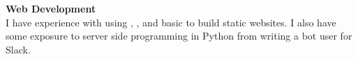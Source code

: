 \textbf{Web Development}\\
I have experience with using , ,  and basic
 to build static websites. I also have some exposure to server
side programming in Python from writing a bot user for Slack.

